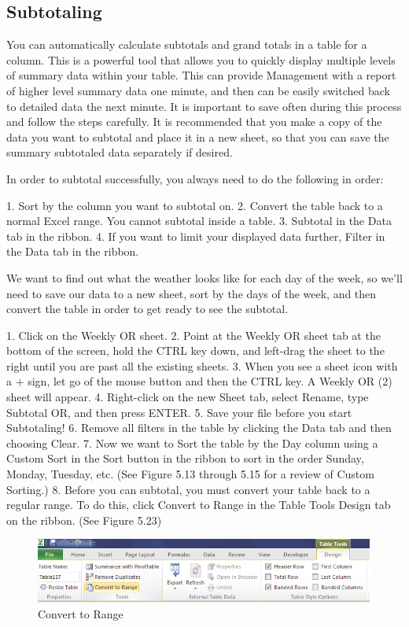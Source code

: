 \subsection{Subtotaling}

You can automatically calculate subtotals and grand totals in a table for a column. This is a powerful
tool that allows you to quickly display multiple levels of summary data within your table. This can
provide Management with a report of higher level summary data one minute, and then can be easily
switched back to detailed data the next minute. It is important to save often during this process and
follow the steps carefully. It is recommended that you make a copy of the data you want to subtotal
and place it in a new sheet, so that you can save the summary subtotaled data separately if desired.

In order to subtotal successfully, you always need to do the following in order:

1.   Sort by the column you want to subtotal on.
2.   Convert the table back to a normal Excel range. You cannot subtotal inside a table.
3.   Subtotal in the Data tab in the ribbon.
4.   If you want to limit your displayed data further, Filter in the Data tab in the ribbon.

We want to find out what the weather looks like for each day of the week, so we’ll need to save our
data to a new sheet, sort by the days of the week, and then convert the table in order to get ready to
see the subtotal.

1. Click on the Weekly OR sheet.
2. Point at the Weekly OR sheet tab at the bottom of the screen, hold the CTRL key down, and
left-drag the sheet to the right until you are past all the existing sheets.
3. When you see a sheet icon with a + sign, let go of the mouse button and then the CTRL key. A
Weekly OR (2) sheet will appear.
4. Right-click on the new Sheet tab, select Rename, type Subtotal OR, and then press ENTER.
5. Save your file before you start Subtotaling!
6. Remove all filters in the table by clicking the Data tab and then choosing Clear.
7. Now we want to Sort the table by the Day column using a Custom Sort in the Sort button in the
ribbon to sort in the order Sunday, Monday, Tuesday, etc. (See Figure 5.13 through 5.15 for a
review of Custom Sorting.)
8. Before you can subtotal, you must convert your table back to a regular range. To do this, click
Convert to Range in the Table Tools Design tab on the ribbon. (See Figure 5.23)


\begin{figure}[H]
	\centering
	\includegraphics[width=\maxwidth{.95\linewidth}]{gfx/ch05_fig23}
	\caption{Convert to Range}
	\label{05:fig23}
\end{figure}





